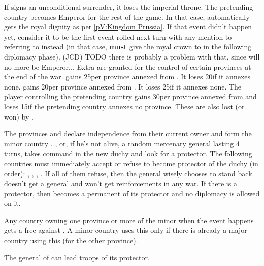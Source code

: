 \phpaix
\aparag If \AUS signs an unconditional surrender, it loses the imperial
throne. The pretending country becomes Emperor for the rest of the game.
\bparag In that case, \PRU automatically gets the royal dignity as per
\ref{pV:Kingdom Prussia}. If that event didn't happen yet, consider it to be
the first event rolled next turn with any mention to \paysbrandebourg
referring to \PRU instead (in that case, \AUS \textbf{must} give the royal
crown to \PRU in the following diplomacy phase). (JCD) TODO there is probably
a problem with that, since \AUS will no more be Emperor...
\aparag Extra \VP are granted for the control of certain provinces at the end
of the war.
\bparag \PRU gains 25\VP per province annexed from \AUS. It loses 20\VP if it
annexes none.
\bparag \AUS gains 20\VP per province annexed from \PRU. It loses 25\VP if it
annexes none.
\bparag The player controlling the pretending country gains 30\VP per province
annexed from \AUS and loses 15\VP if the pretending country annexes no
province. These \VP are also lost (or won) by \AUS.





\phevnt
\aparag The provinces \provinceCourlande and \provinceLivonija declare
independence from their current owner and form the minor country
\payscourlande.
\aparag {}, or, if he's not alive, a random mercenary
general lasting 4 turns, takes command in the new duchy and look for a
protector.
\bparag The following countries must immediately accept or refuse to become
protector of the duchy (in order): \FRA, \AUS, \PRU, \HOL.
\bparag If all of them refuse, then the general wisely chooses to stand
back. \payscourlande doesn't get a general and won't get reinforcements in any
war.
\bparag If there is a protector, then \payscourlande becomes a permanent
\VASSAL of its protector and no diplomacy is allowed on it.

\phdipl
\aparag Any country owning one province or more of the minor when the event
happens gets a free \CB against \payscourlande.
\bparag A minor country uses this \CB only if there is already a major country
using this \CB (for the other province).

\phadm
\aparag The general of \payscourlande can lead troops of its protector.

